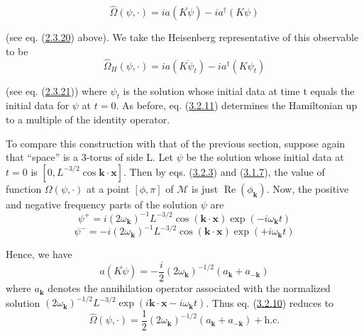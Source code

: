 \documentclass[11pt,a4paper]{article}
\begin{document}
\hypertarget{source-52}{}
\begin{equation*}
\widehat{\Omega}(\psi,\cdot) = ia(\overline{K\psi}) - ia^{\dagger}(K\psi) \tag{3.2.10}\label{eq:3.2.10}
\end{equation*}

(see eq. (\hyperref[eq:2.3.20]{2.3.20}) above). We take the Heisenberg representative of this observable to be
\begin{equation*}
\widehat{\Omega}_{H}(\psi, \cdot) = ia(\overline{K\psi_{t}}) - ia^{\dagger}(K\psi_{t}) \tag{3.2.11}\label{eq:3.2.11}
\end{equation*}

(see eq. (\hyperref[eq:2.3.21]{2.3.21})) where \(\psi_t\) is the solution whose initial data at time t equals the initial data for \(\psi\) at \(t=0\). As before, eq. (\hyperref[eq:3.2.11]{3.2.11}) determines the Hamiltonian up to a multiple of the identity operator.

To compare this construction with that of the previous section, suppose again that ``space'' is a 3-torus of side L. Let \(\psi\) be the solution whose initial data at \(t=0\) is \([0, L^{-3/2}\cos \mathbf{k}\cdot\mathbf{x}]\). Then by eqs. (\hyperref[eq:3.2.3]{3.2.3}) and (\hyperref[eq:3.1.7]{3.1.7}), the value of function \(\Omega(\psi,\cdot)\) at a point \([\phi,\pi]\) of \(\mathcal{M}\) is just \(\operatorname{Re}(\phi_{\mathbf{k}})\). Now, the positive and negative frequency parts of the solution \(\psi\) are
\begin{equation*}
\psi^{+} = i(2\omega_{\mathbf{k}})^{-1}L^{-3/2}\cos(\mathbf{k}\cdot\mathbf{x})\exp(-i\omega_{\mathbf{k}}t) \tag{3.2.12}\label{eq:3.2.12}
\end{equation*}
\begin{equation*}
\psi^{-} = -i(2\omega_{\mathbf{k}})^{-1}L^{-3/2}\cos(\mathbf{k}\cdot\mathbf{x}) \exp(+i\omega_{\mathbf{k}}t) \tag{3.2.13}\label{eq:3.2.13}
\end{equation*}

Hence, we have
\begin{equation*}
a(\overline{K\psi}) = -\frac{i}{2} (2\omega_{\mathbf{k}})^{-1/2} (a_{\mathbf{k}} + a_{-\mathbf{k}}) \tag{3.2.14}\label{eq:3.2.14}
\end{equation*}
where \(a_{\mathbf{k}}\) denotes the annihilation operator associated with the normalized solution \((2\omega_{\mathbf{k}})^{-1/2}L^{-3/2}\exp(i\mathbf{k}\cdot\mathbf{x}-i\omega_{\mathbf{k}}t)\). Thus eq. (\hyperref[eq:3.2.10]{3.2.10}) reduces to
\begin{equation*}
\widehat{\Omega}(\psi, \cdot) = \frac{1}{2} (2\omega_{\mathbf{k}})^{-1/2} (a_{\mathbf{k}} + a_{-\mathbf{k}}) + \text{h.c.} \tag{3.2.15}\label{eq:3.2.15}
\end{equation*}
\end{document}
